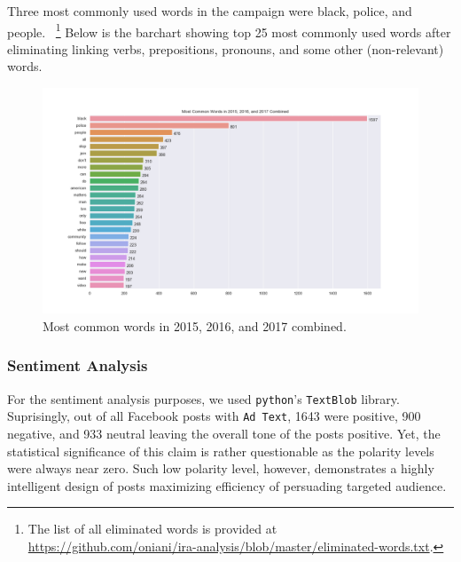 \documentclass[12pt]{article}
\theoremstyle{definition}
\begin{document}
\bigskip

Three most commonly used words in the campaign were black, police, and people.
~\footnote{The list of all eliminated words is provided at\\
\url{https://github.com/oniani/ira-analysis/blob/master/eliminated-words.txt}.}
Below is the barchart showing top 25 most commonly used words after eliminating
linking verbs, prepositions, pronouns, and some other (non-relevant) words.

\begin{figure}[H]
\centering
\includegraphics[width=\columnwidth]{./image/barchart-plots/barchart_word_counts.png}
\caption*{Most common words in 2015, 2016, and 2017 combined.}
\end{figure}


\subsubsection*{\centering Sentiment Analysis}
For the sentiment analysis purposes, we used \texttt{python}'s \texttt{TextBlob}
library. Suprisingly, out of all Facebook posts with \texttt{Ad Text}, 1643 were
positive, 900 negative, and 933 neutral leaving the overall tone of the posts
positive. Yet, the statistical significance of this claim is rather questionable
as the polarity levels were always near zero. Such low polarity level, however,
demonstrates a highly intelligent design of posts maximizing efficiency of
persuading targeted audience.
\end{document}

